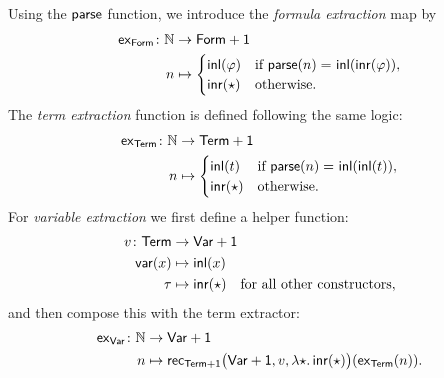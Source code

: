 \begin{defns}
    Using the $\mathsf{parse}$ function, we introduce the \textsl{formula extraction} map by
    \begin{align*}
        \fun{ex}_{\fun{Form}}\colon\N
            &\to\fun{Form}+\fun1 \\
        n&\mapsto \begin{cases}
            \fun{inl}(\varphi)
                &\text{if }
                \fun{parse}(n)
                    \eq{}
                    \fun{inl}(\fun{inr}(\varphi)),\\
            \fun{inr}(\fstar)
                &\text{otherwise}.
        \end{cases}
    \end{align*}
    The \textsl{term extraction} function is defined following the same logic:
    \begin{align*}
        \fun{ex}_{\fun{Term}}\colon\N
            &\to\fun{Term}+\fun1\\
        n&\mapsto\begin{cases}
        \fun{inl}(t)
            &\text{if }
                \fun{parse}(n)
                \eq{}
                \fun{inl}(\fun{inl}(t)),\\
        \fun{inr}(\fstar)
            &\text{otherwise}.
        \end{cases}
    \end{align*}
    For \textsl{variable extraction} we first define a helper function:
    \begin{align*}
        v\colon\fun{Term}&\to\fun{Var}+\fun1\\
        \fun{var}(x)&\mapsto\fun{inl}(x)\\
        \tau&\mapsto\fun{inr}(\fstar)
            \quad\text{for all other constructors},
    \end{align*}
    and then compose this with the term extractor:
    \begin{align*}
        \fun{ex}_{\fun{Var}}\colon\N
            &\to\fun{Var}+\fun1\\
        n&\mapsto \fun{rec}_{\fun{Term}+\fun1}
            \bigl(
                \fun{Var}+\fun1, 
                v, 
                \lambda \fstar.\,\fun{inr}(\fstar)
            \bigr)
        (\fun{ex}_{\fun{Term}}(n)).
    \end{align*}


\end{defns}
